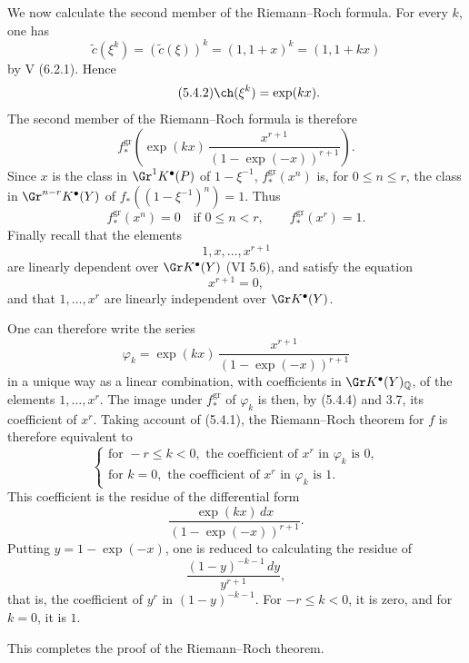We now calculate the second member of the Riemann--Roch formula. For every \(k\), one has
\[
 \widetilde c(\xi^k)=(\widetilde c(\xi))^k=(1,1+x)^k=(1,1+kx)
\]
by V (6.2.1). Hence
\begin{equation}\tag{5.4.2}
 \ch(\xi^k)=\exp(kx).
\end{equation}
The second member of the Riemann--Roch formula is therefore
\begin{equation}\tag{5.4.3}
 f^{\mathrm{gr}}_*\left(\exp(kx)\,
 \frac{x^{r+1}}{(1-\exp(-x))^{r+1}}\right).
\end{equation}
Since \(x\) is the class in \(\Gr^1K^{\bullet}(P)\) of \(1-\xi^{-1}\), \(f^{\mathrm{gr}}_*(x^n)\) is, for \(0\leq n\leq r\), the class in
\(\Gr^{n-r}K^{\bullet}(Y)\) of \(f_*((1-\xi^{-1})^n)=1\). Thus
\begin{equation}\tag{5.4.4}
 f^{\mathrm{gr}}_*(x^n)=0\quad\text{if }0\leq n<r,\qquad
 f^{\mathrm{gr}}_*(x^r)=1.
\end{equation}
Finally recall that the elements
\[
1,x,\ldots,x^{r+1}
\]
are linearly dependent over \(\Gr K^{\bullet}(Y)\) (VI 5.6), and satisfy the equation
\begin{equation}\tag{5.4.5}
 x^{r+1}=0,
\end{equation}
and that \(1,\ldots,x^r\) are linearly independent over \(\Gr K^{\bullet}(Y)\).

One can therefore write the series
\[
\varphi_k=\exp(kx)\,
\frac{x^{r+1}}{(1-\exp(-x))^{r+1}}
\]
in a unique way as a linear combination, with coefficients in
\(\Gr K^{\bullet}(Y)_{\mathbb Q}\), of the elements \(1,\ldots,x^r\). The image under \(f^{\mathrm{gr}}_*\) of \(\varphi_k\) is then, by (5.4.4) and 3.7, its coefficient of \(x^r\). Taking account of (5.4.1), the Riemann--Roch theorem for \(f\) is therefore equivalent to
\[
\left\{
\begin{array}{ll}
\text{for }-r\leq k<0,\text{ the coefficient of }x^r\text{ in }\varphi_k\text{ is }0,\\
\text{for }k=0,\text{ the coefficient of }x^r\text{ in }\varphi_k\text{ is }1.
\end{array}
\right.
\tag{RR}
\]
This coefficient is the residue of the differential form
\[
 \frac{\exp(kx)\,dx}{(1-\exp(-x))^{r+1}}.
\]
Putting \(y=1-\exp(-x)\), one is reduced to calculating the residue of
\[
 \frac{(1-y)^{-k-1}\,dy}{y^{r+1}},
\]
that is, the coefficient of \(y^r\) in \((1-y)^{-k-1}\). For \(-r\leq k<0\), it is zero, and for \(k=0\), it is \(1\).

This completes the proof of the Riemann--Roch theorem.

